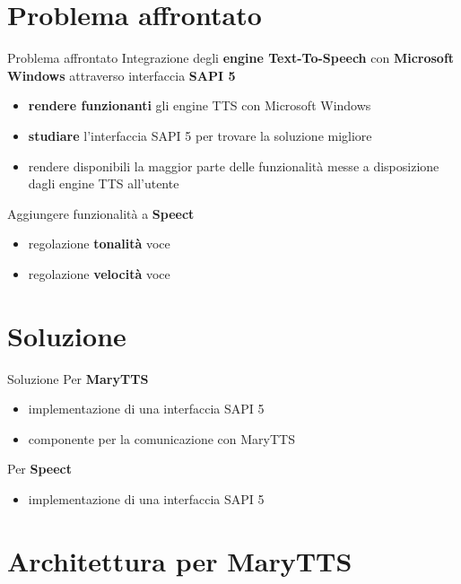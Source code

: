\documentclass{beamer}
\begin{document}
	\section{Problema affrontato}

	\begin{frame}{Problema affrontato}
		Integrazione degli \textbf{engine Text-To-Speech} con \textbf{Microsoft Windows} attraverso interfaccia \textbf{SAPI 5}
		\begin{itemize}
		\item \textbf{rendere funzionanti} gli engine TTS con Microsoft Windows
		\item \textbf{studiare} l'interfaccia SAPI 5 per trovare la soluzione migliore
		\item rendere disponibili la maggior parte delle funzionalità messe a disposizione dagli engine TTS all'utente
		\end{itemize}
		\vspace{10pt}
		Aggiungere funzionalità a \textbf{Speect}
		\begin{itemize}
			\item regolazione \textbf{tonalità} voce
			\item regolazione \textbf{velocità} voce
		\end{itemize}
	\end{frame}

	\section{Soluzione}
	
	\begin{frame}{Soluzione}
		Per \textbf{MaryTTS}
		\begin{itemize}
			\item implementazione di una interfaccia SAPI 5
			\item componente per la comunicazione con MaryTTS
		\end{itemize}
		Per \textbf{Speect}
		\begin{itemize}
			\item implementazione di una interfaccia SAPI 5
		\end{itemize}
	\end{frame}

	\section{Architettura per MaryTTS}
	
\end{document}
